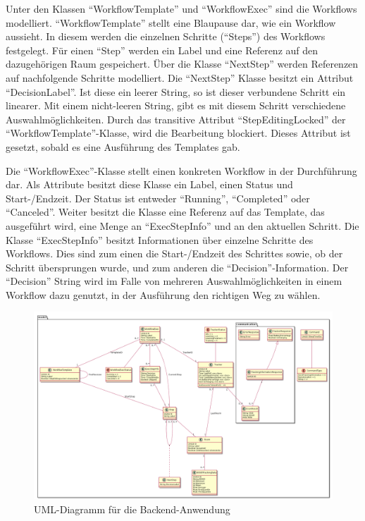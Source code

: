 Unter den Klassen \enquote{WorkflowTemplate} und \enquote{WorkflowExec} sind die Workflows modelliert.
\enquote{WorkflowTemplate} stellt eine Blaupause dar, wie ein Workflow aussieht.
In diesem werden die einzelnen Schritte (\enquote{Steps}) des Workflows festgelegt.
Für einen \enquote{Step} werden ein Label und eine Referenz auf den dazugehörigen Raum gespeichert.
Über die Klasse \enquote{NextStep} werden Referenzen auf nachfolgende Schritte modelliert.
Die \enquote{NextStep} Klasse besitzt ein Attribut \enquote{DecisionLabel}.
Ist diese ein leerer String, so ist dieser verbundene Schritt ein linearer.
Mit einem nicht-leeren String, gibt es mit diesem Schritt verschiedene Auswahlmöglichkeiten.
Durch das transitive Attribut \enquote{StepEditingLocked} der \enquote{WorkflowTemplate}-Klasse, wird die Bearbeitung blockiert.
Dieses Attribut ist gesetzt, sobald es eine Ausführung des Templates gab.

Die \enquote{WorkflowExec}-Klasse stellt einen konkreten Workflow in der Durchführung dar.
Als Attribute besitzt diese Klasse ein Label, einen Status und Start-/Endzeit.
Der Status ist entweder \enquote{Running}, \enquote{Completed} oder \enquote{Canceled}.
Weiter besitzt die Klasse eine Referenz auf das Template, das ausgeführt wird, eine Menge an \enquote{ExecStepInfo} und an den aktuellen Schritt.
Die Klasse \enquote{ExecStepInfo} besitzt Informationen über einzelne Schritte des Workflows.
Dies sind zum einen die Start-/Endzeit des Schrittes sowie, ob der Schritt übersprungen wurde, und zum anderen die \enquote{Decision}-Information.
Der \enquote{Decision} String wird im Falle von mehreren Auswahlmöglichkeiten in einem Workflow dazu genutzt, in der Ausführung den richtigen Weg zu wählen.

\begin{figure}
	\includegraphics[width=\textwidth]{images/uml.png}
	\centering
	\caption{UML-Diagramm für die Backend-Anwendung}
	\label{fig:uml}
\end{figure}

